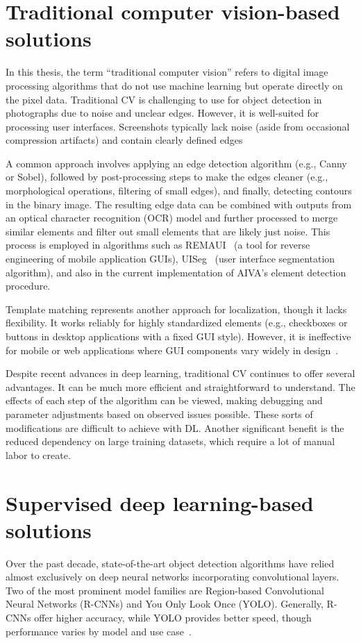 \documentclass[
  digital,     %
  oneside,     %
  nosansbold,  %
  nocolorbold, %
  lof,         %
  lot,         %
]{fithesis4}
\begin{document}
\raggedbottom
\section{Traditional computer vision-based solutions}
\label{sec:traditionalCV}

In this thesis, the term \enquote{traditional computer vision} refers to digital image processing algorithms that do not use machine learning but operate directly on the pixel data. Traditional CV is challenging to use for object detection in photographs due to noise and unclear edges. However, it is well-suited for processing user interfaces. Screenshots typically lack noise (aside from occasional compression artifacts) and contain clearly defined edges

A common approach involves applying an edge detection algorithm (e.g., Canny or Sobel), followed by post-processing steps to make the edges cleaner (e.g., morphological operations, filtering of small edges), and finally, detecting contours in the binary image. The resulting edge data can be combined with outputs from an optical character recognition (OCR) model and further processed to merge similar elements and filter out small elements that are likely just noise. This process is employed in algorithms such as REMAUI~\cite{remaui} (a tool for reverse engineering of mobile application GUIs), UISeg~\cite{uiseg} (user interface segmentation algorithm), and also in the current implementation of AIVA's element detection procedure.

Template matching represents another approach for localization, though it lacks flexibility. It works reliably for highly standardized elements (e.g., checkboxes or buttons in desktop applications with a fixed GUI style). However, it is ineffective for mobile or web applications where GUI components vary widely in design~\cite{ODforGUI_CV_DL_or_both}.

Despite recent advances in deep learning, traditional CV continues to offer several advantages. It can be much more efficient and straightforward to understand. The effects of each step of the algorithm can be viewed, making debugging and parameter adjustments based on observed issues possible. These sorts of modifications are difficult to achieve with DL. Another significant benefit is the reduced dependency on large training datasets, which require a lot of manual labor to create.

\section{Supervised deep learning-based solutions}
Over the past decade, state-of-the-art object detection algorithms have relied almost exclusively on deep neural networks incorporating convolutional layers. Two of the most prominent model families are Region-based Convolutional Neural Networks (R-CNNs) and You Only Look Once (YOLO). Generally, R-CNNs offer higher accuracy, while YOLO provides better speed, though performance varies by model and use case~\cite{ObjectDetectionHistorySurvey}.
\end{document}

